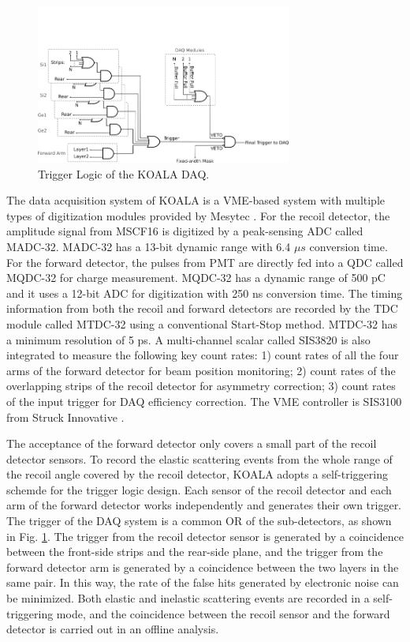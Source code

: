 \documentclass[number,5p]{elsarticle}
\begin{document}
\begin{figure}[htbp]
\centering
\includegraphics[width=0.75\textwidth]{./trigger_logic.png}
\caption{Trigger Logic of the KOALA DAQ.}
\label{fig:trigger_logic}
\end{figure}

The data acquisition system of KOALA is a VME-based system with multiple types
of digitization modules provided by Mesytec \cite{mesytec}.
For the recoil detector, the amplitude signal from MSCF16 is digitized by a peak-sensing ADC called MADC-32.
MADC-32 has a 13-bit dynamic range with 6.4 \(\mu s\) conversion time.
For the forward detector, the pulses from PMT are directly fed into a QDC called MQDC-32 for charge measurement.
MQDC-32 has a dynamic range of 500 pC and it uses a 12-bit ADC for digitization with 250 ns conversion time.
The timing information from both the recoil and forward detectors are recorded by the TDC module called MTDC-32 using a conventional Start-Stop method.
MTDC-32 has a minimum resolution of 5 ps.
A multi-channel scalar called SIS3820 \cite{sis} is also integrated to measure the following key count rates: 1) count rates of all the four arms of the forward detector for 
beam position monitoring; 2) count rates of the overlapping strips of the recoil detector for asymmetry correction; 3) count rates of the input trigger
for DAQ efficiency correction.
The VME controller is SIS3100 from Struck Innovative \cite{sis}.

The acceptance of the forward detector only covers a small part of the recoil detector sensors.
To record the elastic scattering events from the whole range of the recoil angle covered by the recoil detector, KOALA adopts a self-triggering schemde for the trigger logic design.
Each sensor of the recoil detector and each arm of the forward detector works independently and generates their own trigger. 
The trigger of the DAQ system is a common OR of the sub-detectors, as shown in Fig. \ref{fig:trigger_logic}.
The trigger from the recoil detector sensor is generated by a coincidence between the front-side strips and the rear-side plane, 
and the trigger from the forward detector arm is generated by a coincidence between the two layers in the same pair.
In this way, the rate of the false hits generated by electronic noise can be minimized.
Both elastic and inelastic scattering events are recorded in a self-triggering mode, and the coincidence between the recoil sensor and the forward detector is carried out in an offline analysis.
\end{document}
